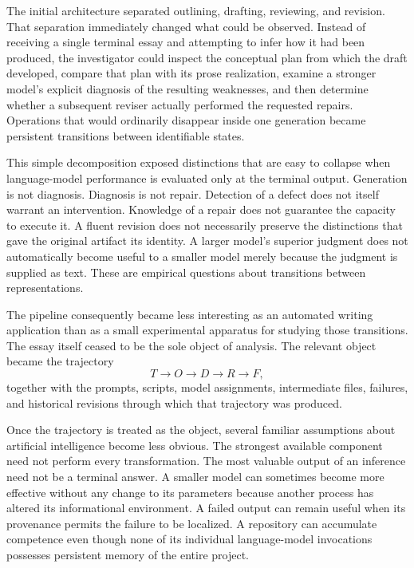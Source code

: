 \documentclass[11pt]{article}
\begin{document}
The initial architecture separated outlining, drafting, reviewing, and revision. That separation immediately changed what could be observed. Instead of receiving a single terminal essay and attempting to infer how it had been produced, the investigator could inspect the conceptual plan from which the draft developed, compare that plan with its prose realization, examine a stronger model's explicit diagnosis of the resulting weaknesses, and then determine whether a subsequent reviser actually performed the requested repairs. Operations that would ordinarily disappear inside one generation became persistent transitions between identifiable states.

This simple decomposition exposed distinctions that are easy to collapse when language-model performance is evaluated only at the terminal output. Generation is not diagnosis. Diagnosis is not repair. Detection of a defect does not itself warrant an intervention. Knowledge of a repair does not guarantee the capacity to execute it. A fluent revision does not necessarily preserve the distinctions that gave the original artifact its identity. A larger model's superior judgment does not automatically become useful to a smaller model merely because the judgment is supplied as text. These are empirical questions about transitions between representations.

The pipeline consequently became less interesting as an automated writing application than as a small experimental apparatus for studying those transitions. The essay itself ceased to be the sole object of analysis. The relevant object became the trajectory
\[
    T
    \longrightarrow
    O
    \longrightarrow
    D
    \longrightarrow
    R
    \longrightarrow
    F,
\]
together with the prompts, scripts, model assignments, intermediate files, failures, and historical revisions through which that trajectory was produced.

Once the trajectory is treated as the object, several familiar assumptions about artificial intelligence become less obvious. The strongest available component need not perform every transformation. The most valuable output of an inference need not be a terminal answer. A smaller model can sometimes become more effective without any change to its parameters because another process has altered its informational environment. A failed output can remain useful when its provenance permits the failure to be localized. A repository can accumulate competence even though none of its individual language-model invocations possesses persistent memory of the entire project.
\end{document}
